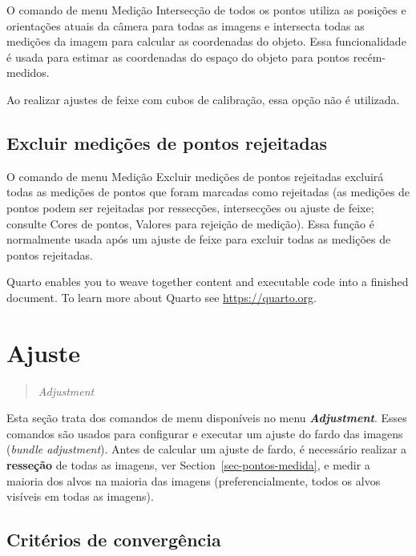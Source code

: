 \documentclass[
  12pt,
  letterpaper,
  DIV=11,
  numbers=noendperiod]{scrreprt}
\begin{document}
O comando de menu Medição \textbar{} Intersecção de todos os pontos
utiliza as posições e orientações atuais da câmera para todas as imagens
e intersecta todas as medições da imagem para calcular as coordenadas do
objeto. Essa funcionalidade é usada para estimar as coordenadas do
espaço do objeto para pontos recém-medidos.

Ao realizar ajustes de feixe com cubos de calibração, essa opção não é
utilizada.

\subsection{Excluir medições de pontos
rejeitadas}\label{excluir-mediuxe7uxf5es-de-pontos-rejeitadas-1}

O comando de menu Medição \textbar{} Excluir medições de pontos
rejeitadas excluirá todas as medições de pontos que foram marcadas como
rejeitadas (as medições de pontos podem ser rejeitadas por ressecções,
intersecções ou ajuste de feixe; consulte Cores de pontos, Valores para
rejeição de medição). Essa função é normalmente usada após um ajuste de
feixe para excluir todas as medições de pontos rejeitadas.

Quarto enables you to weave together content and executable code into a
finished document. To learn more about Quarto see
\url{https://quarto.org}.

\section{\texorpdfstring{\textbf{Ajuste}}{Ajuste}}\label{ajuste-3}

\begin{quote}
\emph{Adjustment}
\end{quote}

Esta seção trata dos comandos de menu disponíveis no menu
\textbf{\emph{Adjustment}}. Esses comandos são usados para configurar e
executar um ajuste do fardo das imagens (\emph{bundle adjustment}).
Antes de calcular um ajuste de fardo, é necessário realizar a
\textbf{resseção} de todas as imagens, ver
Section~\ref{sec-pontos-medida}, e medir a maioria dos alvos na maioria
das imagens (preferencialmente, todos os alvos visíveis em todas as
imagens).

\subsection{Critérios de
convergência}\label{crituxe9rios-de-converguxeancia-1}
\end{document}
